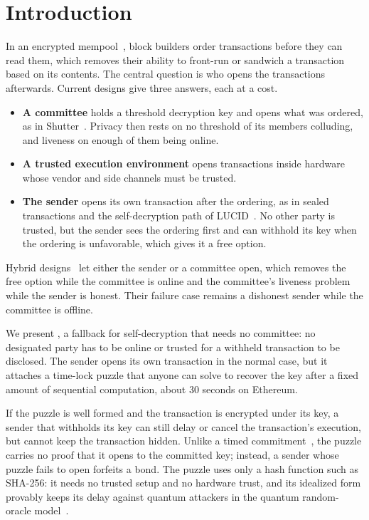 \section{Introduction}\label{sec:intro}

In an encrypted mempool~\cite{PP26}, block builders order transactions before they can read them, which removes their ability to front-run or sandwich a transaction based on its contents. The central question is who opens the transactions afterwards. Current designs give three answers, each at a cost.
\begin{itemize}[leftmargin=1.5em]
  \item \textbf{A committee} holds a threshold decryption key and opens what was ordered, as in Shutter~\cite{Shutter}. Privacy then rests on no threshold of its members colluding, and liveness on enough of them being online.
  \item \textbf{A trusted execution environment} opens transactions inside hardware whose vendor and side channels must be trusted.
  \item \textbf{The sender} opens its own transaction after the ordering, as in sealed transactions and the self-decryption path of LUCID~\cite{LUCID}. No other party is trusted, but the sender sees the ordering first and can withhold its key when the ordering is unfavorable, which gives it a free option.
\end{itemize}
Hybrid designs~\cite{WM25} let either the sender or a committee open, which removes the free option while the committee is online and the committee's liveness problem while the sender is honest. Their failure case remains a dishonest sender while the committee is offline.

We present \leanseal, a fallback for self-decryption that needs no committee: no designated party has to be online or trusted for a withheld transaction to be disclosed. The sender opens its own transaction in the normal case, but it attaches a time-lock puzzle that anyone can solve to recover the key after a fixed amount of sequential computation, about 30 seconds on Ethereum.

If the puzzle is well formed and the transaction is encrypted under its key, a sender that withholds its key can still delay or cancel the transaction's execution, but cannot keep the transaction hidden. Unlike a timed commitment~\cite{BN00}, the puzzle carries no proof that it opens to the committed key; instead, a sender whose puzzle fails to open forfeits a bond. The puzzle uses only a hash function such as SHA-256: it needs no trusted setup and no hardware trust, and its idealized form provably keeps its delay against quantum attackers in the quantum random-oracle model~\cite{ACHLM23}.

